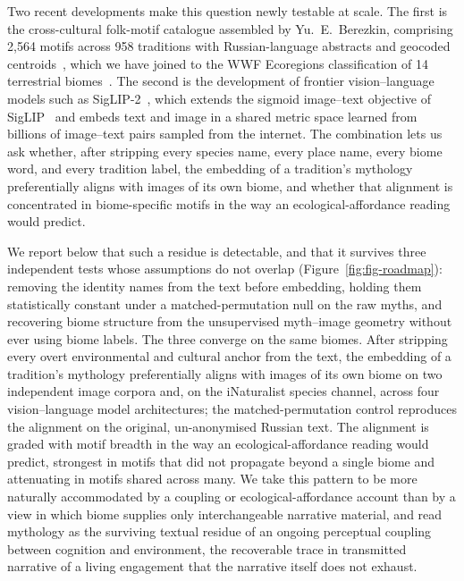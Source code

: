 \documentclass[11pt,a4paper]{article}
\begin{document}
Two recent developments make this question newly testable at scale.
The first is the cross-cultural folk-motif catalogue assembled by
Yu.\ E.\ Berezkin, comprising 2{,}564 motifs across 958 traditions
with Russian-language abstracts and geocoded
centroids~\citep{berezkin2024catalogue}, which we have joined to the
WWF Ecoregions classification of 14 terrestrial
biomes~\citep{olson2001terrestrial}. The second is the development of
frontier vision--language models such as
SigLIP-2~\citep{tschannen2024siglip2}, which extends the sigmoid
image--text objective of SigLIP~\citep{zhai2023siglip} and embeds text
and image in a shared metric space learned from billions of
image--text pairs sampled from the internet. The combination lets us ask whether, after
stripping every species name, every place name, every biome word, and
every tradition label, the embedding of a tradition's mythology
preferentially aligns with images of its own biome, and whether
that alignment is concentrated in biome-specific motifs in the
way an ecological-affordance reading would predict.

We report below that such a residue is detectable, and that it
survives three independent tests whose assumptions do not overlap
(Figure~\ref{fig:fig-roadmap}): removing the identity names from the
text before embedding, holding them statistically constant under a
matched-permutation null on the raw myths, and recovering biome
structure from the unsupervised myth--image geometry without ever
using biome labels. The three converge on the same biomes. After
stripping every overt environmental and cultural anchor from the
text, the embedding of a tradition's mythology preferentially aligns
with images of its own biome on two independent image corpora and,
on the iNaturalist species channel, across four vision--language
model architectures; the matched-permutation control reproduces the
alignment on the original, un-anonymised Russian text. The alignment
is graded with motif breadth in the way an ecological-affordance
reading would predict, strongest in motifs that did not propagate
beyond a single biome and attenuating in motifs shared across
many. We take this pattern to be more naturally accommodated by a
coupling or ecological-affordance account than by a view in which
biome supplies only interchangeable narrative material, and read
mythology as the surviving textual residue of an ongoing
perceptual coupling between cognition and environment, the
recoverable trace in transmitted narrative of a living engagement
that the narrative itself does not exhaust.
\end{document}
